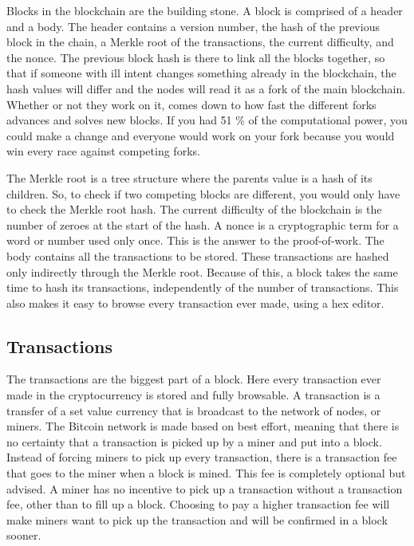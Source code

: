 \documentclass[12pt]{article}
\begin{document}
Blocks in the blockchain are the building stone. A block is comprised of a header and a body. The header contains a version number, the hash of the previous block in the chain, a Merkle root of the transactions, the current difficulty, and the nonce. The previous block hash is there to link all the blocks together, so that if someone with ill intent changes something already in the blockchain, the hash values will differ and the nodes will read it as a fork of the main blockchain. Whether or not they work on it, comes down to how fast the different forks advances and solves new blocks. If you had 51 \% of the computational power, you could make a change and everyone would work on your fork because you would win every race against competing forks.

The Merkle root\cite{merkle} is a tree structure where the parents value is a hash of its children. So, to check if two competing blocks are different, you would only have to check the Merkle root hash. The current difficulty of the blockchain is the number of zeroes at the start of the hash. A nonce is a cryptographic term for a word or number used only once. This is the answer to the proof-of-work. The body contains all the transactions to be stored. These transactions are hashed only indirectly through the Merkle root. Because of this, a block takes the same time to hash its transactions, independently of the number of transactions. This also makes it easy to browse every transaction ever made, using a hex editor.
 


\subsection{Transactions}

The transactions are the biggest part of a block. Here every transaction ever made in the cryptocurrency is stored and fully browsable. A transaction is a transfer of a set value currency that is broadcast to the network of nodes, or miners. The Bitcoin network is made based on best effort, meaning that there is no certainty that a transaction is picked up by a miner and put into a block. Instead of forcing miners to pick up every transaction, there is a transaction fee that goes to the miner when a block is mined. This fee is completely optional but advised. A miner has no incentive to pick up a transaction without a transaction fee, other than to fill up a block. Choosing to pay a higher transaction fee will make miners want to pick up the transaction and will be confirmed in a block sooner. 
\end{document}
